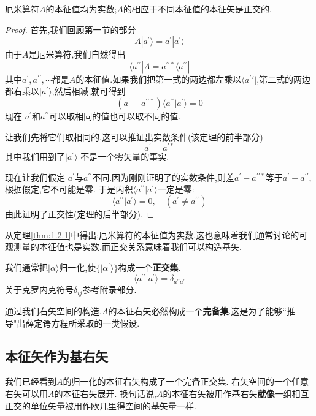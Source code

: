 \begin{theorem}\label{thm:1.2.1}
	厄米算符$A$的本征值均为实数;$A$的相应于不同本征值的本征矢是正交的.
\end{theorem}
\begin{proof}
	首先,我们回顾第一节的部分
	$$
	A|a^{\prime}\rangle=a^{\prime}| a^{\prime}\rangle
	$$
	由于$A$是厄米算符,我们自然得出
	$$
	\langle a^{\prime\prime}|A=a^{\prime\prime*}\langle a^{\prime\prime}|
	$$
	其中$a^\prime,a^{\prime\prime},\cdots$都是$A$的本征值.如果我们把第一式的两边都左乘以$\langle a^\prime\prime|$,第二式的两边都右乘以$|a^\prime\rangle$,然后相减,就可得到
	$$(a^{\prime}-a^{\prime\prime*})\langle a^{\prime\prime}|a^{\prime}\rangle=0$$
	现在 $a^{\prime}$和$a^{\prime\prime}$可以取相同的值也可以取不同的值.
	
	让我们先将它们取相同的.这可以推证出实数条件(该定理的前半部分)
	$$a^{\prime}=a^{\prime*}$$
	其中我们用到了$|a^\prime\rangle$ 不是一个零矢量的事实. 
	
	现在让我们假定 $a^\prime$与$a^{\prime\prime}$不同.因为刚刚证明了的实数条件,则差$a^{\prime}-a^{\prime\prime*}$等于$a^{\prime}-a^{\prime\prime}$,根据假定,它不可能是零. 于是内积$\langle a^{\prime\prime}|a^{\prime}\rangle$一定是零:
	$$\langle a^{\prime\prime}| a^{\prime}\rangle=0,\quad(a^{\prime}\neq a^{\prime\prime})$$
	由此证明了正交性(定理的后半部分).
\end{proof}
从定理\ref{thm:1.2.1}中得出:厄米算符的本征值为实数.这也意味着我们通常讨论的可观测量的本征值也是实数.而正交关系意味着我们可以构造基矢.

我们通常把$|\alpha\rangle$归一化,使$\{|\alpha^{'} \rangle\}$构成一个\textbf{正交集}.
\begin{equation}\label{eq1.2.1}
	\langle a^{\prime\prime}| a^{\prime}\rangle=\delta_{a^{\prime\prime}a^{\prime}}
\end{equation}
关于克罗内克符号$\delta_{ij}$参考附录部分.

通过我们右矢空间的构造,$A$的本征右矢必然构成一个\textbf{完备集}.这是为了能够``推导"出薛定谔方程所采取的一类假设.
\subsection{本征矢作为基右矢}
我们已经看到$A$的归一化的本征右矢构成了一个完备正交集. 右矢空间的一个任意右矢可以用$A$的本征右矢展开. 换句话说,$A$的本征右矢被用作基右矢\textbf{就像}一组相互正交的单位矢量被用作欧几里得空间的基矢量一样.

